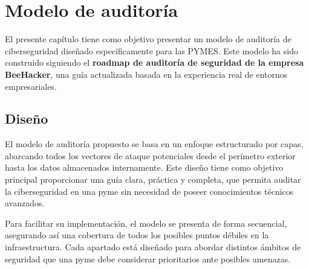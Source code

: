\documentclass[a4paper, 10pt]{article}
\begin{document}
 


































\clearpage



\section{Modelo de auditoría}

El presente capítulo tiene como objetivo presentar un modelo de auditoría de ciberseguridad diseñado específicamente para las PYMES. Este modelo ha sido construido siguiendo el \textbf{roadmap de auditoría de seguridad de la empresa BeeHacker}, 
una guía actualizada basada en la experiencia real de entornos empresariales. 

\subsection{Diseño}

El modelo de auditoría propuesto se basa en un enfoque estructurado por capas, abarcando todos los vectores de ataque 
potenciales desde el perímetro exterior hasta los datos almacenados internamente. 
Este diseño tiene como objetivo principal proporcionar una guía clara, práctica y completa, que permita 
auditar la ciberseguridad en una pyme sin necesidad de poseer conocimientos técnicos avanzados. 

\par\vspace{0.5cm}

Para facilitar su implementación, el modelo se presenta de forma  secuencial, asegurando así una cobertura de todos los posibles puntos débiles en la infraestructura.
Cada apartado está diseñado para abordar distintos ámbitos de seguridad que una pyme debe considerar prioritarios ante posibles amenazas.
\end{document}
